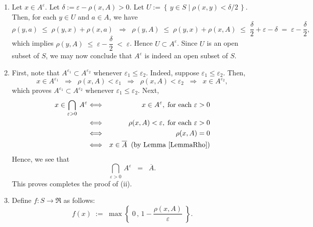 \begin{enumerate}
\item
	Let $x \in A^{\varepsilon}$. Let $\delta := \varepsilon - \rho(x,A) > 0$.
	Let $U := \left\{\,y \in S \;\vert\; \rho(x,y) < \delta/2 \,\right\}$.
	Then, for each $y \in U$ and $a \in A$, we have
	\begin{equation*}
	\rho(y,a) \;\leq\; \rho(y,x) + \rho(x,a)
	\;\;\Longrightarrow\;\;
	\rho(y,A) \;\leq\; \rho(y,x) + \rho(x,A) \;\leq\; \dfrac{\delta}{2} + \varepsilon - \delta \;=\; \varepsilon - \dfrac{\delta}{2},
	\end{equation*}
	which implies $\rho(y,A) \;\leq\; \varepsilon - \dfrac{\delta}{2} \; < \; \varepsilon$.
	Hence $U \subset A^{\varepsilon}$.
	Since $U$ is an open subset of $S$, we may now conclude that $A^{\varepsilon}$ is indeed an open subset of $S$.
\item
	First, note that $A^{\varepsilon_{1}} \subset A^{\varepsilon_{2}}$ whenever $\varepsilon_{1} \leq \varepsilon_{2}$.
	Indeed, suppose $\varepsilon_{1} \leq \varepsilon_{2}$. Then,
	\begin{equation*}
	x \in A^{\varepsilon_{1}}
	\;\;\Longrightarrow\;\;
	\rho(x,A) < \varepsilon_{1}
	\;\;\Longrightarrow\;\;
	\rho(x,A) < \varepsilon_{2}
	\;\;\Longrightarrow\;\;
	x \in A^{\varepsilon_{2}},
	\end{equation*}
	which proves $A^{\varepsilon_{1}} \subset A^{\varepsilon_{2}}$ whenever $\varepsilon_{1} \leq \varepsilon_{2}$.
	Next,
	\begin{eqnarray*}
	x \in \bigcap_{\varepsilon > 0}\,A^{\varepsilon}
	&\Longleftrightarrow& x \in A^{\varepsilon}, \;\textnormal{for each $\varepsilon > 0$}
	\\
	&\Longleftrightarrow& \rho(x,A) < \varepsilon, \;\textnormal{for each $\varepsilon > 0$}
	\\
	&\Longleftrightarrow& \rho(x,A) = 0
	\\
	&\Longleftrightarrow& x \in \overline{A} \;\;\textnormal{(by Lemma \ref{LemmaRho})}
	\end{eqnarray*}
	Hence, we see that
	\begin{equation*}
	\bigcap_{\varepsilon > 0}\,A^{\varepsilon} \;\; = \;\; \overline{A}.
	\end{equation*}
	This proves completes the proof of (ii).
\item
	Define $f : S \longrightarrow \Re$ as follows:
	\begin{equation*}
	f(x) \; := \;
	\max\left\{\;
	0\,,\,
	1 - \dfrac{\rho(x,A)}{\varepsilon}
	\;\right\}.
	\end{equation*}

\end{enumerate}
